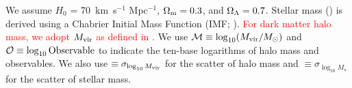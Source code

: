 \documentclass[fleqn,usenatbib,useAMS]{mnras}
\begin{document}

    We assume $H_0$ = 70~km~s$^{-1}$ Mpc$^{-1}$, ${\Omega}_{\rm m}=0.3$, and ${\Omega}_{\rm
    \Lambda}=0.7$.
    Stellar mass (\mstar{}) is derived using a Chabrier Initial Mass Function (IMF;
    \citealt{Chabrier2003}).
    \textcolor{red}{
    For dark matter halo mass, we adopt $M_{\rm vir}$ as defined in \citet{BryanNorman1998}.
    }
    We use $\mathcal{M}\equiv \log_{10} (M_{\rm vir}/M_{\odot})$ and 
    $\mathcal{O}\equiv \log_{10} \rm Observable$ to indicate the ten-base logarithms of
    halo mass and observables.
    We also use \sigmvir{}$\equiv \sigma_{\log_{10} M_{\rm vir}}$ for the scatter of 
    halo mass and \sigms{}$\equiv \sigma_{\log_{10} M_{\star}}$ for the scatter of stellar mass. 
    
\end{document}
